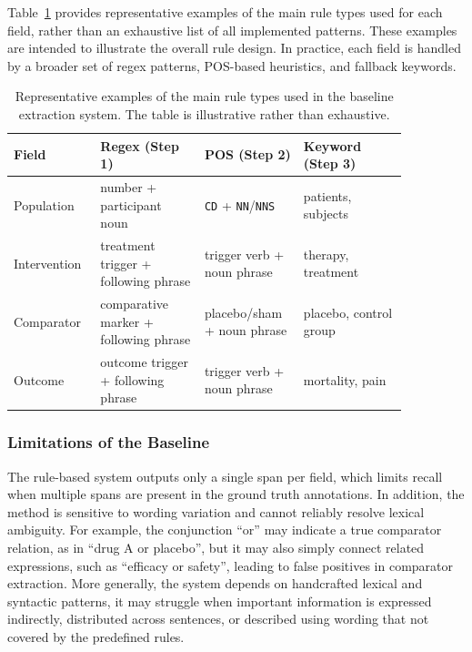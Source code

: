 \documentclass{article}
\begin{document}
Table~\ref{tab:baseline_rules} provides representative examples of the main rule types used for each field, rather than an exhaustive list of all implemented patterns. These examples are intended to illustrate the overall rule design. In practice, each field is handled by a broader set of regex patterns, POS-based heuristics, and fallback keywords.

\begin{table}[ht]
\centering
\small
\begin{tabular}{p{0.16\linewidth} p{0.24\linewidth} p{0.22\linewidth} p{0.24\linewidth}}
\hline
\textbf{Field} & \textbf{Regex (Step 1)} & \textbf{POS (Step 2)} & \textbf{Keyword (Step 3)} \\
\hline
Population & number + participant noun & \texttt{CD} + \texttt{NN}/\texttt{NNS} & patients, subjects \\
Intervention & treatment trigger + following phrase & trigger verb + noun phrase & therapy, treatment \\
Comparator & comparative marker + following phrase & placebo/sham + noun phrase & placebo, control group \\
Outcome & outcome trigger + following phrase & trigger verb + noun phrase & mortality, pain \\
\hline
\end{tabular}
\caption{Representative examples of the main rule types used in the baseline extraction system. The table is illustrative rather than exhaustive.}
\label{tab:baseline_rules}
\end{table}


\subsubsection{Limitations of the Baseline}

The rule-based system outputs only a single span per field, which limits recall when multiple spans are present in the ground truth annotations. In addition, the method is sensitive to wording variation and cannot reliably resolve lexical ambiguity. For example, the conjunction ``or'' may indicate a true comparator relation, as in ``drug A or placebo'', but it may also simply connect related expressions, such as ``efficacy or safety'', leading to false positives in comparator extraction. More generally, the system depends on handcrafted lexical and syntactic patterns, it may struggle when important information is expressed indirectly, distributed across sentences, or described using wording that not covered by the predefined rules.
\end{document}
